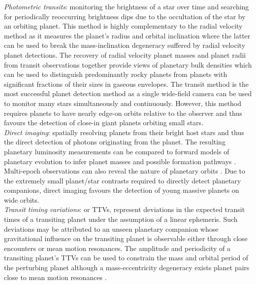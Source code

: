 \emph{Photometric transits}: monitoring the brightness of a star over time and
searching for periodically reoccurring brightness dips due to the occultation of the star
by an orbiting planet. This method is highly complementary to the radial velocity method
as it measures the planet's radius and orbital inclination where the latter can be
used to break the mass-inclination degeneracy suffered by radial velocity planet
detections. The recovery of radial velocity planet masses and planet radii from transit observations
together provide
views of planetary bulk densities which can be used to distinguish predominantly
rocky planets from planets with significant fractions of their sizes in gaseous envelopes.
The transit method is the most successful planet detection method as a single
wide-field camera can be used to monitor many stars simultaneously and continuously.
However, this method requires planets to have nearly edge-on orbits relative to the observer
and thus favours the detection of close-in giant planets orbiting small stars. \\

\emph{Direct imaging}: spatially resolving planets from their bright host stars and thus the
direct detection of photons originating from the planet. The resulting planetary luminosity
measurements can be compared to forward models of planetary
evolution to infer planet masses and possible formation pathways \citep{marley07}.
Multi-epoch observations can also reveal the nature of planetary orbits \citep{wang18}.
Due to the extremely small planet/star contrasts required to directly detect planetary companions,
direct imaging favours the detection of young massive planets on wide orbits. \\

\emph{Transit timing variations}: or TTVs, represent deviations in the expected transit
times of a transiting planet under the assumption of a linear ephemeris. Such deviations
may be attributed to an unseen planetary companion whose gravitational influence on the
transiting planet is observable either through close encounters or mean motion resonances.
The amplitude and periodicity of a transiting planet's TTVs can be used to constrain the mass
and orbital period of the perturbing planet although a mass-eccentricity degeneracy exists
planet pairs close to mean motion resonances \citep{lithwick12}. \\

